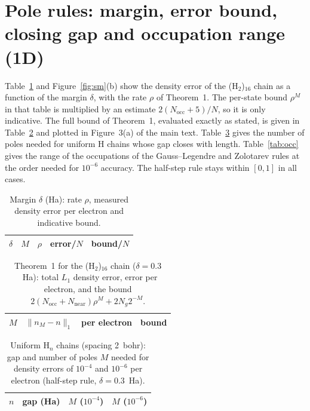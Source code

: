 \documentclass[aps,prb,onecolumn,superscriptaddress,floatfix]{revtex4-2}
\begin{document}
\section{Pole rules: margin, error bound, closing gap and occupation range (1D)}

Table~\ref{tab:margin} and Figure~\ref{fig:sm}(b) show the density error of the (H$_2$)$_{16}$ chain as a function of the
margin $\delta$, with the rate $\rho$ of Theorem~1. The per-state bound $\rho^M$ in that table is multiplied by an estimate
$2(N_\mathrm{occ}+5)/N$, so it is only indicative. The full bound of Theorem~1, evaluated exactly as stated, is given in
Table~\ref{tab:bound} and plotted in Figure~3(a) of the main text. Table~\ref{tab:gap} gives the number of poles needed for
uniform H chains whose gap closes with length. Table~\ref{tab:occ} gives the range of the occupations of the
Gauss--Legendre and Zolotarev rules at the order needed for $10^{-6}$ accuracy. The half-step rule stays within $[0,1]$ in
all cases.

\begin{table}[h]
\caption{\label{tab:margin}Margin $\delta$ (Ha): rate $\rho$, measured density error per electron and indicative bound.}
\begin{ruledtabular}
\begin{tabular}{rrrrr}
$\delta$ & $M$ & $\rho$ & error/$N$ & bound/$N$ \\
\hline

\end{tabular}
\end{ruledtabular}
\end{table}

\begin{table}[h]
\caption{\label{tab:bound}Theorem~1 for the (H$_2$)$_{16}$ chain ($\delta=0.3$~Ha): total $L_1$ density error, error per
electron, and the bound $2(N_\mathrm{occ}+N_\mathrm{near})\rho^M+2N_g2^{-M}$.}
\begin{ruledtabular}
\begin{tabular}{rrrr}
$M$ & $\|n_M-n\|_1$ & per electron & bound \\
\hline

\end{tabular}
\end{ruledtabular}
\end{table}

\begin{table}[h]
\caption{\label{tab:gap}Uniform H$_n$ chains (spacing 2~bohr): gap and number of poles $M$ needed for density errors of
$10^{-4}$ and $10^{-6}$ per electron (half-step rule, $\delta=0.3$~Ha).}
\begin{ruledtabular}
\begin{tabular}{rrrr}
$n$ & gap (Ha) & $M$ ($10^{-4}$) & $M$ ($10^{-6}$) \\
\hline

\end{tabular}
\end{ruledtabular}
\end{table}
\end{document}
